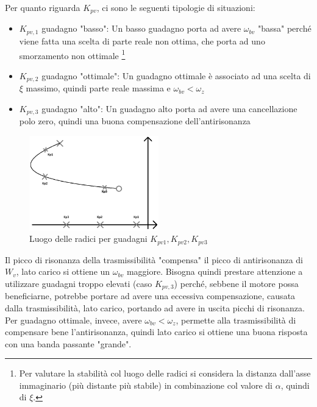 Per quanto riguarda \(K_{pv}\), ci sono le seguenti tipologie di situazioni:
\begin{itemize}
    \item \(K_{pv,1}\) guadagno "basso": Un basso guadagno porta ad avere \(\omega_{bv}\) "bassa" perché viene fatta una scelta di parte reale non ottima, che porta ad uno smorzamento non ottimale \footnote{Per valutare la stabilità col luogo delle radici si considera la distanza dall'asse immaginario (più distante più stabile) in combinazione col valore di \(\alpha\), quindi di \(\xi\).}
    \item \(K_{pv,2}\) guadagno "ottimale": Un guadagno ottimale è associato ad una scelta di \(\xi\) massimo, quindi parte reale massima e \(\omega_{bv} < \omega_z\)
    \item \(K_{pv,3}\) guadagno "alto": Un guadagno alto porta ad avere una cancellazione polo zero, quindi una buona compensazione dell'antirisonanza
\end{itemize}

\begin{figure}[h]
    \centering
    \includegraphics[width=0.5\textwidth]{Immagini/rlocus_vari_guadagni_controlloVel_PI.png}
    \caption{Luogo delle radici per guadagni \(K_{pv1},K_{pv2},K_{pv3}\)}
\end{figure}

Il picco di risonanza della trasmissibilità "compensa" il picco di antirisonanza di \(W_v\), lato carico si ottiene un \(\omega_{bv}\) maggiore.
Bisogna quindi prestare attenzione a utilizzare guadagni troppo elevati (caso \(K_{pv,3}\)) perché, sebbene il motore possa beneficiarne, potrebbe portare ad avere una eccessiva compensazione, causata dalla trasmissibilità, lato carico, portando ad avere in uscita picchi di risonanza.
Per guadagno ottimale, invece, avere \(\omega_{bv} < \omega_z\), permette alla trasmissibilità di compensare bene l'antirisonanza, quindi lato carico si ottiene una buona risposta con una banda passante "grande".


